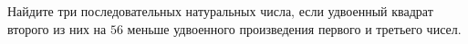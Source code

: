 \begin{ex}
	\begin{condition}
		Найдите три последовательных натуральных числа, если удвоенный квадрат второго из них на \( 56 \) меньше удвоенного произведения первого и третьего чисел.
	\end{condition}
\end{ex}